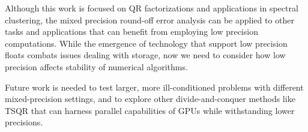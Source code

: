 \documentclass[review,onefignum,onetabnum]{siamart190516}
\begin{document}
Although this work is focused on QR factorizations and applications in spectral clustering, the mixed precision round-off error analysis can be applied to other tasks and applications that can benefit from employing low precision computations. 
While the emergence of technology that support low precision floats combats issues dealing with storage, now we need to consider how low precision affects stability of numerical algorithms. 

Future work is needed to test larger, more ill-conditioned problems with different mixed-precision settings, and to explore other divide-and-conquer methods like TSQR that can harness parallel capabilities of GPUs while withstanding lower precisions. 

%
%

\end{document}
